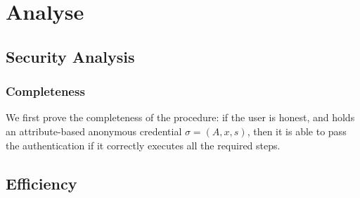 \section{Analyse}
\subsection{Security Analysis}
\subsubsection{Completeness}
We first prove the completeness of the procedure: if the user is honest, and holds an attribute-based anonymous credential $\sigma=(A, x, s)$, then it is able to pass the authentication if it correctly executes all the required steps.

\subsection{Efficiency}
